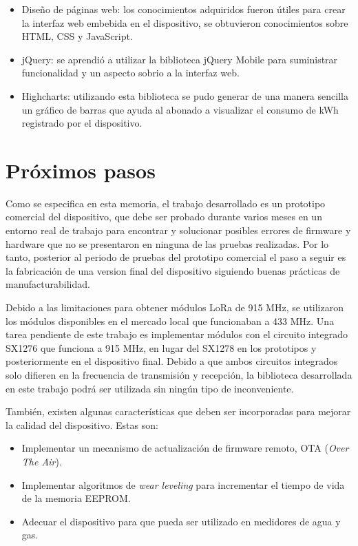 \begin{itemize}
	\item Diseño de páginas web: los conocimientos adquiridos fueron útiles para crear la interfaz web embebida en el dispositivo, se obtuvieron conocimientos sobre HTML, CSS y JavaScript.
	\item jQuery: se aprendió a utilizar la biblioteca jQuery Mobile para suministrar funcionalidad y un aspecto sobrio a la interfaz web.
	\item Highcharts: utilizando esta biblioteca se pudo generar de una manera sencilla un gráfico de barras que ayuda al abonado a visualizar el consumo de kWh registrado por el dispositivo.
\end{itemize}

\section{Próximos pasos}

Como se especifica en esta memoria, el trabajo desarrollado es un prototipo comercial del dispositivo, que debe ser probado durante varios meses en un entorno real de trabajo para encontrar y solucionar posibles errores de firmware y hardware que no se presentaron en ninguna de las pruebas realizadas. Por lo tanto, posterior al periodo de pruebas del prototipo comercial el paso a seguir es la fabricación de una version final del dispositivo siguiendo buenas prácticas de manufacturabilidad.

Debido a las limitaciones para obtener módulos LoRa de 915 MHz, se utilizaron los módulos disponibles en el mercado local que funcionaban a 433 MHz. Una tarea pendiente de este trabajo es implementar módulos con el circuito integrado SX1276 que funciona a 915 MHz, en lugar del SX1278 en los prototipos y posteriormente en el dispositivo final. Debido a que ambos circuitos integrados solo difieren en la frecuencia de transmisión y recepción, la biblioteca desarrollada en este trabajo podrá ser utilizada sin ningún tipo de inconveniente.

También, existen algunas características que deben ser incorporadas para mejorar la calidad del dispositivo. Estas son:

\begin{itemize}
	\item Implementar un mecanismo de actualización de firmware remoto, OTA (\textit{Over The Air}).
	\item Implementar algoritmos de \textit{wear leveling} para incrementar el tiempo de
	 vida de la memoria EEPROM.
	\item Adecuar el dispositivo para que pueda ser utilizado en medidores de agua y gas.
\end{itemize}
